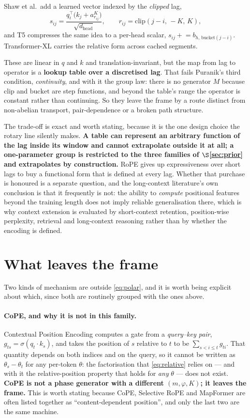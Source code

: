 \documentclass[11pt]{article}
\newcommand{\hd}{d_{\mathrm{head}}}
\begin{document}
Shaw et al.\ add a learned vector indexed by the \emph{clipped} lag,
\[
  s_{ij} = \frac{q_i^{\!\top}\big(k_j + a^K_{r_{ij}}\big)}{\sqrt{\hd}},
  \qquad r_{ij} = \mathrm{clip}(j-i,\,-K,\,K),
\]
and T5 compresses the same idea to a per-head scalar,
$s_{ij} \mathrel{+}= b_{h,\,\mathrm{bucket}(j-i)}$. Transformer-XL carries the
relative form across cached segments.

These are linear in $q$ and $k$ and translation-invariant, but the map from lag to
operator is a \textbf{lookup table over a discretised lag}. That fails Puranik's
third condition, \emph{continuity}, and with it the group law: there is no generator
$M$ because $\mathrm{clip}$ and $\mathrm{bucket}$ are step functions, and beyond the
table's range the operator is constant rather than continuing. So they leave the
frame by a route distinct from non-abelian transport, pair-dependence or a broken
path structure.

The trade-off is exact and worth stating, because it is the one design choice the
rotary line silently makes. \textbf{A table can represent an arbitrary function of
the lag inside its window and cannot extrapolate outside it at all; a one-parameter
group is restricted to the three families of $\S$\ref{sec:prior} and
extrapolates by construction.} RoPE gives up expressiveness over short lags to buy
a functional form that is defined at every lag. Whether that purchase is honoured is
a separate question, and the long-context literature's own conclusion is that it
frequently is not: the ability to \emph{compute} positional features beyond the
training length does not imply reliable generalisation there, which is why context
extension is evaluated by short-context retention, position-wise perplexity,
retrieval and long-context reasoning rather than by whether the encoding is defined.

\section{What leaves the frame}

Two kinds of mechanism are outside \eqref{eq:polar}, and it is worth being
explicit about which, since both are routinely grouped with the ones above.

\paragraph{CoPE, and why it is not in this family.} Contextual Position Encoding
computes a gate from a \emph{query--key pair}, $g_{ts} = \sigma(q_t\cdot k_s)$, and
takes the position of $s$ relative to $t$ to be $\sum_{s < i \le t} g_{ti}$. That
quantity depends on both indices and on the query, so it cannot be written as
$\theta_s - \theta_t$ for any per-token $\theta$: the factorisation that
\eqref{eq:relative} relies on --- and with it the relative-position property that
holds for \emph{any} $\theta$ --- does not exist. \textbf{CoPE is not a phase
generator with a different $(m,\varphi,K)$; it leaves the frame.} This is worth
stating because CoPE, Selective RoPE and MapFormer are often listed together as
``content-dependent position'', and only the last two are the same machine.
\end{document}
